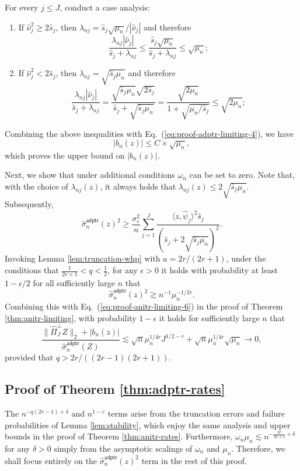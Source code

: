 \documentclass[11pt,a4paper]{article}
\renewcommand{\hat}{\widehat}
\theoremstyle{definition}
\theoremstyle{plain}
\theoremstyle{remark}
\newcommand{\adptr}{\mathsf{adptr}}
\newcommand{\pd}[1]{
	{ \color{blue} PD: #1}
}
\begin{document}
For every $j\leq J$, conduct a case analysis: 
\begin{enumerate}
\item If $\hat\nu_j^2\geq 2\hat s_j$, then $\lambda_{nj}=\hat s_j\sqrt{\mu_n}/|\hat\nu_j|$ and therefore
$$
\frac{\lambda_{nj}|\hat\nu_j|}{\hat s_j+\lambda_{nj}}\leq \frac{\hat s_j\sqrt{\mu_n}}{\hat s_j+\lambda_{nj}}\leq \sqrt{\mu_n};
$$
\item If $\hat\nu_j^2< 2\hat s_j$, then $\lambda_{nj}=\sqrt{\hat s_j\mu_n}$ and therefore
$$
\frac{\lambda_{nj}|\hat\nu_j|}{\hat s_j+\lambda_{nj}} = \frac{\sqrt{\hat s_j\mu_n}\sqrt{2\hat s_j}}{\hat s_j+\sqrt{\hat s_j\mu_n}} = \frac{\sqrt{2\mu_n}}{1+\sqrt{\mu_n/\hat s_j}}\leq \sqrt{2\mu_n};
$$
\end{enumerate}
Combining the above inequalities with Eq.~(\ref{eq:proof-adptr-limiting-4}), we have
$$
\big|b_n(z)\big| \leq C\times  \sqrt{\mu_n},
$$
which proves the upper bound on $|b_n(z)|$.

Next, we show that under additional conditions $\omega_n$ can be set to zero. Note that, with the choice of $\lambda_{nj}(z)$, it always holds that $\lambda_{nj}(z)\leq 2\sqrt{\hat s_j\mu_n}$.
Subsequently,
$$
\hat\sigma_n^\adptr(z)^2 \geq \frac{\sigma_\varepsilon^2}{n}\sum_{j=1}^J \frac{\langle z,\hat\psi_j\rangle^2\hat s_j}{(\hat s_j+2\sqrt{\hat s_j\mu_n})^2}.
$$
Invoking Lemma \ref{lem:truncation-whp} with $a=2r/(2r+1)$, under the conditions that $\frac{1}{2r+1}<q<\frac{1}{2}$, for any $\epsilon>0$ it holds with probability at least $1-\epsilon/2$ for all sufficiently large $n$ that
$$
\hat\sigma_n^\adptr(z)^2 \gtrsim n^{-1}\mu_n^{-1/2r}.
$$
Combining this with Eq.~(\ref{eq:proof-anitr-limiting-6}) in the proof of Theorem \ref{thm:anitr-limiting}, with probability $1-\epsilon$ it holds for sufficiently large $n$ that
$$
\frac{\|\hat\Pi_J^\perp Z\|_2+|b_n(z)|}{\hat\sigma_n^\adptr(Z)} \lesssim \sqrt{n}\mu_n^{1/4r}J^{1/2-r} + \sqrt{n}\mu_n^{1/4r}\sqrt{\mu_n} \to 0,
$$
provided that $q>2r/((2r-1)(2r+1))$. 




\subsection{Proof of Theorem \ref{thm:adptr-rates}}

The $n^{-q(2r-1)+\delta}$ and $n^{1-c}$ terms arise from the truncation errors and failure probabilities of Lemma \ref{lem:stability}, which enjoy the same analysis and upper bounds
in the proof of Theorem \ref{thm:anitr-rates}.
Furthermore, $\omega_n\mu_n\lesssim n^{-\frac{2r}{2r+1}+\delta}$ for any $\delta>0$ simply from the asymptotic scalings of $\omega_n$ and $\mu_n$.
Therefore, we shall focus entirely on the $\hat\sigma_n^\adptr(z)^2$ term in the rest of this proof.
\end{document}
